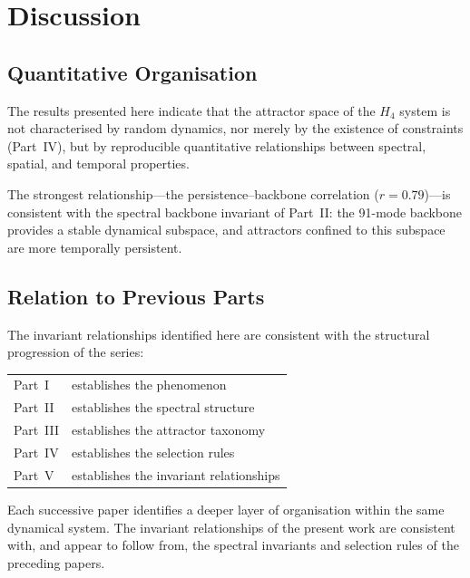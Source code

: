 \documentclass[12pt,a4paper]{article}
\newcommand{\Hfour}{H_4}
\begin{document}
\section{Discussion}\label{sec:discussion}

\subsection{Quantitative Organisation}

The results presented here indicate that the attractor space of the
$\Hfour$ system is not characterised by random dynamics, nor merely
by the existence of constraints (Part~IV), but by reproducible
quantitative relationships between spectral, spatial, and temporal
properties.

The strongest relationship---the persistence--backbone correlation
($r = 0.79$)---is consistent with the spectral backbone invariant
of Part~II: the 91-mode backbone provides a stable dynamical
subspace, and attractors confined to this subspace are more temporally
persistent.

\subsection{Relation to Previous Parts}

The invariant relationships identified here are consistent with the
structural progression of the series:

\begin{center}
\begin{tabular}{@{}ll@{}}
Part~I   & establishes the phenomenon \\
Part~II  & establishes the spectral structure \\
Part~III & establishes the attractor taxonomy \\
Part~IV  & establishes the selection rules \\
Part~V   & establishes the invariant relationships \\
\end{tabular}
\end{center}

Each successive paper identifies a deeper layer of organisation
within the same dynamical system.  The invariant relationships of the
present work are consistent with, and appear to follow from, the
spectral invariants and selection rules of the preceding papers.
\end{document}
